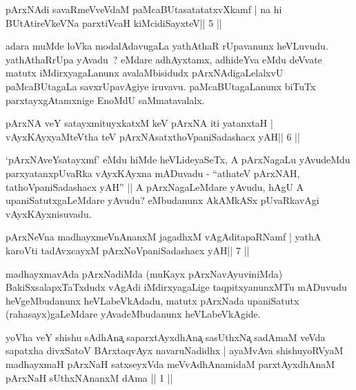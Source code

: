 \begin{shl}
pArxNAdi savaRmeVveVdaM paMcaBUtasatatatxvXkamf |
na hi BUtAtireVkeVNa parxtiVcaH kiMcidiSayxteV\hfill || 5 ||
\end{shl}

\begin{artha}
adara muMde loVka modalAdavugaLa yathAthaR rUpavanunx heVLuvudu. yathAthaRrUpa yAvadu~? eMdare adhAyxtamx, adhideYva eMdu deVvate matutx iMdirxyagaLanunx avalaMbisidudx pArxNAdigaLelalxvU paMcaBUtagaLa savxrUpavAgiye iruvavu. paMcaBUtagaLanunx biTuTx parxtayxgAtamxnige EnoMdU saMmatavalalx.
\end{artha}

\begin{shl}
pArxNA veY satayxmituyxkatxM keV pArxNA iti yatanxtaH |
vAyxKAyxyaMteV\s tha teV pArxNAsatxthoVpaniSadashacx yAH\hfill || 6 ||
\end{shl}

\begin{artha}
`pArxNAveYsatayxmf' eMdu hiMde heVLideyaSeTx, A pArxNagaLu yAvudeMdu   parxyatanxpUvaRka vAyxKAyxna mADuvadu - ``athateV pArxNAH,   tathoVpaniSadashacx yAH'' || A pArxNagaLeMdare yAvudu, hAgU A   upaniSatutxgaLeMdare yAvudu? eMbudanunx AkAMkASx pUvaRkavAgi   vAyxKAyxnisuvadu.
\end{artha}



\begin{shl}
pArxNeVna madhayxmeVnAnanxM jagadhxM vAgAditapaRNamf |
yathA karoVti tadAvxcayxM pArxNoVpaniSadashacx yAH\hfill || 7 ||
\end{shl}

\begin{artha}
madhayxmavAda pArxNadiMda (muKayx pArxNavAyuviniMda) BakiSxsalapxTaTxdudx vAgAdi iMdirxyagaLige taqpitxyanunxMTu mADuvudu heVgeMbudanunx heVLabeVkAdadu, matutx pArxNada upaniSatutx (rahasayx)gaLeMdare yAvadeMbudanunx heVLabeVkAgide.
\end{artha}

\newpage
\begin{shl}
yoVha veY shishu sAdhAna{\c} saparxtAyxdhAna{\c} sasUthxNa{\c} sadAmaM veVda
sapatxha divxSatoV BArxtaqvAyx navaruNadidhx | ayaMvAva shishuyoRVyaM
madhayxmaH pArxNaH satxseyxVda meVvAdhAnamidaM parxtAyxdhAnaM pArxNaH
sUthxNAnanxM dAma || 1 ||
\end{shl}


